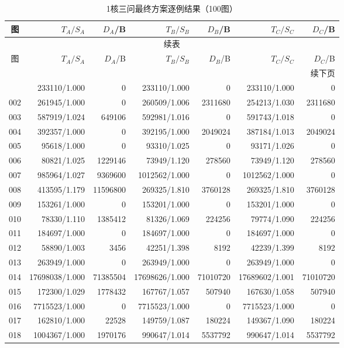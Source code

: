 \begin{longtable}{crrrrrr}
\caption{1核三问最终方案逐例结果（100图）}\label{tab:v7-detail-1}\\
\toprule
图 & $T_A/S_A$ & $D_A$/B & $T_B/S_B$ & $D_B$/B & $T_C/S_C$ & $D_C$/B \\
\midrule
\endfirsthead
\multicolumn{7}{c}{续表}\\
\toprule
图 & $T_A/S_A$ & $D_A$/B & $T_B/S_B$ & $D_B$/B & $T_C/S_C$ & $D_C$/B \\
\midrule
\endhead
\midrule\multicolumn{7}{r}{续下页}\\
\endfoot
\bottomrule
\endlastfoot
001 & 233110/1.000 & 0 & 233110/1.000 & 0 & 233110/1.000 & 0 \\
002 & 261945/1.000 & 0 & 260509/1.006 & 2311680 & 254213/1.030 & 2311680 \\
003 & 587919/1.024 & 649106 & 592981/1.016 & 0 & 591743/1.018 & 0 \\
004 & 392357/1.000 & 0 & 392195/1.000 & 2049024 & 387184/1.013 & 2049024 \\
005 & 95618/1.000 & 0 & 93310/1.025 & 0 & 93171/1.026 & 0 \\
006 & 80821/1.025 & 1229146 & 73949/1.120 & 278560 & 73949/1.120 & 278560 \\
007 & 985964/1.027 & 9369600 & 1012562/1.000 & 0 & 1012562/1.000 & 0 \\
008 & 413595/1.179 & 11596800 & 269325/1.810 & 3760128 & 269325/1.810 & 3760128 \\
009 & 153261/1.000 & 0 & 153201/1.000 & 0 & 153201/1.000 & 0 \\
010 & 78330/1.110 & 1385412 & 81326/1.069 & 224256 & 79774/1.090 & 224256 \\
011 & 184697/1.000 & 0 & 184697/1.000 & 0 & 184697/1.000 & 0 \\
012 & 58890/1.003 & 3456 & 42251/1.398 & 8192 & 42239/1.399 & 8192 \\
013 & 263949/1.000 & 0 & 263949/1.000 & 0 & 263949/1.000 & 0 \\
014 & 17698038/1.000 & 71385504 & 17698626/1.000 & 71010720 & 17689602/1.001 & 71010720 \\
015 & 172300/1.029 & 1778432 & 167767/1.057 & 507940 & 167630/1.058 & 507940 \\
016 & 7715523/1.000 & 0 & 7715523/1.000 & 0 & 7715523/1.000 & 0 \\
017 & 162810/1.000 & 22528 & 149759/1.087 & 180224 & 149367/1.090 & 180224 \\
018 & 1004367/1.000 & 1970176 & 990647/1.014 & 5537792 & 990647/1.014 & 5537792 \\

\end{longtable}
